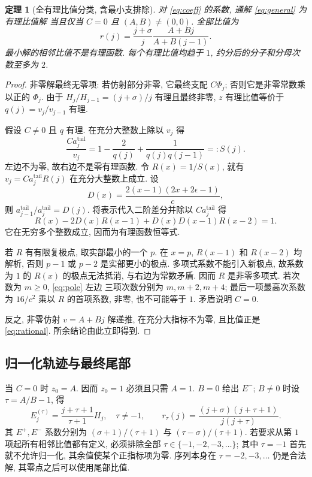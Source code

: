 \documentclass[UTF8]{ctexart}
\newtheorem{theorem}{定理}[section]
\newcommand{\eps}{\epsilon}
\newcommand{\sig}{\sigma}
\begin{document}
\begin{theorem}[全有理比值分类, 含最小支排除]\label{thm:full}
 对 \eqref{eq:coeff} 的系数, 通解 \eqref{eq:general} 为有理比值解
 当且仅当 $C=0$ 且 $(A,B)\ne(0,0)$. 全部比值为
\begin{equation}\label{eq:rational}
 r(j)=\frac{j+\sig}{j}\frac{A+Bj}{A+B(j-1)}.
\end{equation}
 最小解的相邻比值不是有理函数. 每个有理比值均趋于 $1$,
 约分后的分子和分母次数至多为 $2$.
\end{theorem}
\begin{proof}
 非零解最终无零项: 若仿射部分非零, 它最终支配 $C\Phi_j$;
 否则它是非零常数乘以正的 $\Phi_j$.
 由于 $H_j/H_{j-1}=(j+\sig)/j$ 有理且最终非零,
 $z$ 有理比值等价于 $q(j)=v_j/v_{j-1}$ 有理.

 假设 $C\ne0$ 且 $q$ 有理. 在充分大整数上除以 $v_j$ 得
\[
 \frac{C a_j^{\mathrm{tail}}}{v_j}
 =1-\frac2{q(j)}+\frac1{q(j)q(j-1)}=:S(j).
\]
 左边不为零, 故右边不是零有理函数. 令 $R(x)=1/S(x)$,
 就有 $v_j=C a_j^{\mathrm{tail}}R(j)$ 在充分大整数上成立.
 设
\[
 D(x)=\frac{2(x-1)(2x+2\eps-1)}c,
\]
 则 $a_{j-1}^{\mathrm{tail}}/a_j^{\mathrm{tail}}=D(j)$.
 将表示代入二阶差分并除以 $Ca_j^{\mathrm{tail}}$ 得
\begin{equation}\label{eq:pole}
 R(x)-2D(x)R(x-1)+D(x)D(x-1)R(x-2)=1.
\end{equation}
 它在无穷多个整数成立, 因而为有理函数恒等式.

 若 $R$ 有有限复极点, 取实部最小的一个 $p$.
 在 $x=p$, $R(x-1)$ 和 $R(x-2)$ 均解析, 否则 $p-1$ 或 $p-2$
 是实部更小的极点. 多项式系数不能引入新极点,
 故系数为 $1$ 的 $R(x)$ 的极点无法抵消, 与右边为常数矛盾.
 因而 $R$ 是非零多项式. 若次数为 $m\ge0$, \eqref{eq:pole} 左边
 三项次数分别为 $m,m+2,m+4$; 最后一项最高次系数为
 $16/c^2$ 乘以 $R$ 的首项系数, 非零, 也不可能等于 $1$.
 矛盾说明 $C=0$.

 反之, 非零仿射 $v=A+Bj$ 解递推, 在充分大指标不为零,
 且比值正是 \eqref{eq:rational}. 所余结论由此立即得到.
\end{proof}

\subsection{归一化轨迹与最终尾部}

当 $C=0$ 时 $z_0=A$. 因而 $z_0=1$ 必须且只需 $A=1$.
$B=0$ 给出 $E^-$; $B\ne0$ 时设 $\tau=A/B-1$, 得
\begin{equation}\label{eq:tau}
 E_j^{(\tau)}=\frac{j+\tau+1}{\tau+1}H_j,\quad \tau\ne-1,
 \qquad r_\tau(j)=\frac{(j+\sig)(j+\tau+1)}{j(j+\tau)}.
\end{equation}
其 $E^+,E^-$ 系数分别为
 $(\sig+1)/(\tau+1)$ 与 $(\tau-\sig)/(\tau+1)$.
若要求从第 $1$ 项起所有相邻比值都有定义, 必须排除全部
$\tau\in\{-1,-2,-3,\ldots\}$; 其中 $\tau=-1$ 首先就不允许归一化,
其余值使某个正指标项为零. 序列本身在 $\tau=-2,-3,\ldots$ 仍是合法解,
其零点之后可以使用尾部比值.
\end{document}
